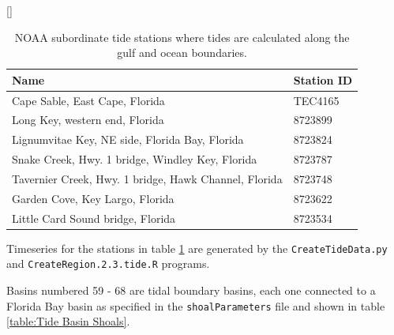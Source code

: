 \begin{table}[H]
  [\FBwidth]
  {
     \caption{ NOAA subordinate tide stations where tides are calculated 
               along the gulf and ocean boundaries. }
     \label{table:Tide Stations}
  }
  {
    \centering
    \begin{tabular}{ l l }
      \hline
      Name & Station ID\\
      \hline
      Cape Sable, East Cape, Florida                        & TEC4165\\
      Long Key, western end, Florida                        & 8723899\\
      Lignumvitae Key, NE side, Florida Bay, Florida        & 8723824\\
      Snake Creek, Hwy. 1 bridge, Windley Key, Florida      & 8723787\\
      Tavernier Creek, Hwy. 1 bridge, Hawk Channel, Florida & 8723748\\
      Garden Cove, Key Largo, Florida                       & 8723622\\
      Little Card Sound bridge, Florida                     & 8723534\\
      \hline
    \end{tabular}
  }
\end{table}

Timeseries for the stations in table \ref{table:Tide Stations} are generated by the \texttt{CreateTideData.py} and \newline \texttt{CreateRegion.2.3.tide.R} programs. 

Basins numbered 59 - 68 are tidal boundary basins, each one connected to a Florida Bay basin as specified in the \texttt{shoalParameters} file and shown in table \ref{table:Tide Basin Shoals}. 

